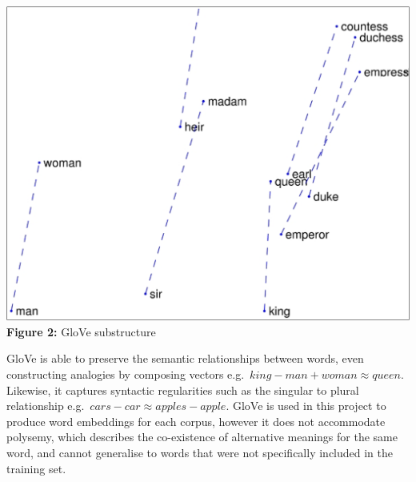 \documentclass[12pt,a4paper]{article}
\begin{document}
\begin{minipage}{0.3\textwidth}
	\vspace{-10pt}
	\begin{center}
		\hspace{-1cm}\includegraphics[width=1.05\textwidth]{Images/outside1.png}\\
		\hspace{-1cm}\textbf{Figure 2:} GloVe substructure\footnotemark[5]\\
		\label{Glove Model}
	\end{center}
\end{minipage} \hfill
\begin{minipage}{0.66\textwidth}
	 GloVe is able to preserve the semantic relationships between words, even constructing analogies by composing vectors e.g.\ $king - man + woman ≈ queen$. Likewise, it captures syntactic regularities such as the singular to plural relationship e.g.\ $cars - car ≈ apples - apple$. GloVe is used in this project to produce word embeddings for each corpus, however it does not accommodate polysemy, which describes the co-existence of alternative meanings for the same word, and cannot generalise to words that were not specifically included in the training set.\\
\end{minipage}\\
\end{document}
